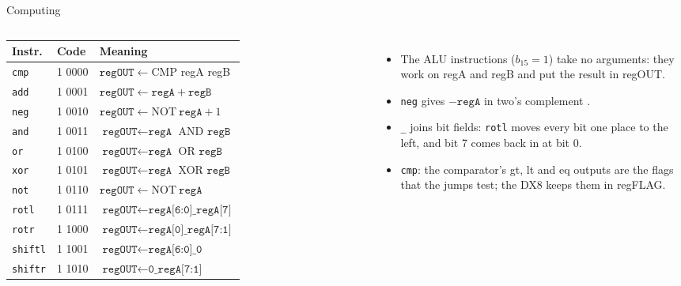 \documentclass[10pt]{wosm-slides}
\begin{document}
\begin{frame}{Computing}
  \begin{columns}[c, totalwidth=\textwidth]
      \centering
      \small
      \begin{tabular}{@{}lll@{}}
        \toprule
        Instr. & Code & Meaning \\
        \midrule
        \texttt{cmp}    & 1 0000 & $\texttt{regOUT} \leftarrow \mathrm{CMP}$ regA regB \\
        \texttt{add}    & 1 0001 & $\texttt{regOUT} \leftarrow \texttt{regA} + \texttt{regB}$ \\
        \texttt{neg}    & 1 0010 & $\texttt{regOUT} \leftarrow \mathrm{NOT}\ \texttt{regA} + 1$ \\
        \texttt{and}    & 1 0011 & $\texttt{regOUT} \leftarrow \texttt{regA}$ AND $\texttt{regB}$ \\
        \texttt{or}     & 1 0100 & $\texttt{regOUT} \leftarrow \texttt{regA}$ OR $\texttt{regB}$ \\
        \texttt{xor}    & 1 0101 & $\texttt{regOUT} \leftarrow \texttt{regA}$ XOR $\texttt{regB}$ \\
        \texttt{not}    & 1 0110 & $\texttt{regOUT} \leftarrow \mathrm{NOT}\ \texttt{regA}$ \\
        \texttt{rotl}   & 1 0111 & $\texttt{regOUT} \leftarrow \texttt{regA[6:0]\_regA[7]}$ \\
        \texttt{rotr}   & 1 1000 & $\texttt{regOUT} \leftarrow \texttt{regA[0]\_regA[7:1]}$ \\
        \texttt{shiftl} & 1 1001 & $\texttt{regOUT} \leftarrow \texttt{regA[6:0]\_0}$ \\
        \texttt{shiftr} & 1 1010 & $\texttt{regOUT} \leftarrow \texttt{0\_regA[7:1]}$ \\
        \bottomrule
      \end{tabular}
      \begin{itemize}
        \item The ALU instructions ($b_{15} = 1$) take no arguments: they work on
          regA and regB and put the result in regOUT.
        \item \texttt{neg} gives $-\texttt{regA}$ in two's complement
          .
        \item \texttt{\_} joins bit fields: \texttt{rotl} moves every bit one place
          to the left, and bit 7 comes back in at bit 0.
        \item \texttt{cmp}: the comparator's gt, lt and eq outputs 
          are the flags that the jumps test; the DX8 keeps them in regFLAG.
      \end{itemize}
  \end{columns}
\end{frame}
\end{document}
